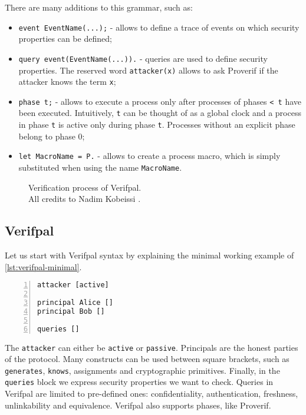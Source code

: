 \lstset{language=proverif}
There are many additions to this grammar, such as:
\begin{itemize}
    \item{\lstinline{event EventName(...);} - allows to define a trace of events on which security properties can be defined;}
    \item{\lstinline{query event(EventName(...)).} - queries are used to define security properties. The reserved word \lstinline{attacker(x)} allows to ask Proverif if the attacker knows the term \lstinline{x};}
    \item{\lstinline{phase t;} - allows to execute a process only after processes of phases \lstinline{< t} have been executed. Intuitively, \lstinline{t} can be thought of as a global clock and a process in phase \lstinline{t}  is active only during phase \lstinline{t}. Processes without an explicit phase belong to phase 0;}
    \item{\lstinline{let MacroName = P.} - allows to create a process macro, which is simply substituted when using the name \lstinline{MacroName}.}
\end{itemize}


\begin{figure}[t]
    \centering
    \caption{Verification process of Verifpal.\\ All credits to Nadim Kobeissi \cite{VerifpalManual}.}
    \label{fig:verifpal-verification}
\end{figure}




\newpage
\subsection{Verifpal}

Let us start with Verifpal syntax by explaining the minimal working example of \cref{lst:verifpal-minimal}.

\lstset{language=verifpal}
\begin{lstlisting}[numbers=left,caption={Verifpal's minimal working example}, label={lst:verifpal-minimal}]
attacker [active]

principal Alice []
principal Bob []

queries []
\end{lstlisting}

The \lstinline{attacker} can either be \lstinline{active} or \lstinline{passive}.
Principals are the honest parties of the protocol. Many constructs can be used between square brackets, such as \lstinline{generates}, \lstinline{knows}, assignments and cryptographic primitives.
Finally, in the \lstinline{queries} block we express security properties we want to check. Queries in Verifpal are limited to pre-defined ones: confidentiality, authentication, freshness, unlinkability and equivalence.
Verifpal also supports phases, like Proverif.



